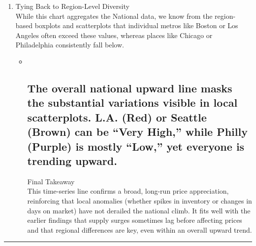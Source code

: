 \documentclass[11pt]{article}
\begin{document}
\begin{enumerate}
\begin{itemize}
    \subsection{The slight plateau in 2023--2024 could tie back to the
    occasional inventory spikes or days-on-market increases we saw for
    certain metros, suggesting a softening demand or a leveling out in
    the national
    average.}\label{the-slight-plateau-in-20232024-could-tie-back-to-the-occasional-inventory-spikes-or-days-on-market-increases-we-saw-for-certain-metros-suggesting-a-softening-demand-or-a-leveling-out-in-the-national-average.}
  \end{itemize}
\item
  Tying Back to Region-Level Diversity\\
  While this chart aggregates the National data, we know from the
  region-based boxplots and scatterplots that individual metros like
  Boston or Los Angeles often exceed these values, whereas places like
  Chicago or Philadelphia consistently fall below.

  \begin{itemize}
  \item ~
    \subsection{The overall national upward line masks the substantial
    variations visible in local scatterplots. L.A. (Red) or Seattle
    (Brown) can be ``Very High,'' while Philly (Purple) is mostly
    ``Low,'' yet everyone is trending
    upward.}\label{the-overall-national-upward-line-masks-the-substantial-variations-visible-in-local-scatterplots.-l.a.-red-or-seattle-brown-can-be-very-high-while-philly-purple-is-mostly-low-yet-everyone-is-trending-upward.}

    Final Takeaway\\
    This time-series line confirms a broad, long-run price appreciation,
    reinforcing that local anomalies (whether spikes in inventory or
    changes in days on market) have not derailed the national climb. It
    fits well with the earlier findings that supply surges sometimes lag
    before affecting prices and that regional differences are key, even
    within an overall upward trend.
  \end{itemize}
\end{enumerate}

\begin{center}\rule{0.5\linewidth}{0.5pt}\end{center}
\end{document}
